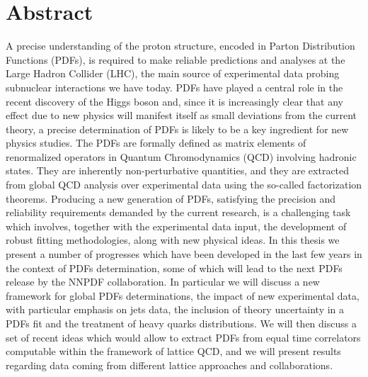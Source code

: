\chapter*{Abstract}
A precise understanding of the proton structure, encoded in Parton Distribution Functions (PDFs), is required 
to make reliable predictions and analyses at the Large Hadron Collider (LHC), 
the main source of experimental data probing subnuclear interactions we have today.
PDFs have played a central role in the recent 
discovery of the Higgs boson and, since it is increasingly clear that any effect due to new physics 
will manifest itself as small deviations from the current theory, 
a precise determination of PDFs is likely to be a key ingredient 
for new physics studies.
%
The PDFs are formally defined as matrix elements of renormalized operators in Quantum Chromodynamics (QCD) involving hadronic states.
They are inherently non-perturbative quantities, and they are extracted from global QCD analysis over
experimental data using the so-called factorization theorems. 
Producing a new generation of PDFs, satisfying the precision and reliability requirements demanded by the current research,
is a challenging task which involves, together with the experimental data input, the development of robust
fitting methodologies, along with new physical ideas. 
%
In this thesis we present a number of progresses which have been developed in the last few years in the context of 
PDFs determination, some of which will lead to the next PDFs release by the NNPDF collaboration. 
In particular we will discuss a new framework for global PDFs determinations, the impact of new experimental data,
with particular emphasis on jets data, the inclusion of theory uncertainty in a PDFs fit 
and the treatment of heavy quarks distributions.
%
We will then discuss a set of recent ideas which would allow to extract PDFs from equal time correlators computable 
within the framework of lattice QCD, and we will present results regarding data coming from different 
lattice approaches and collaborations.

\blankpage


